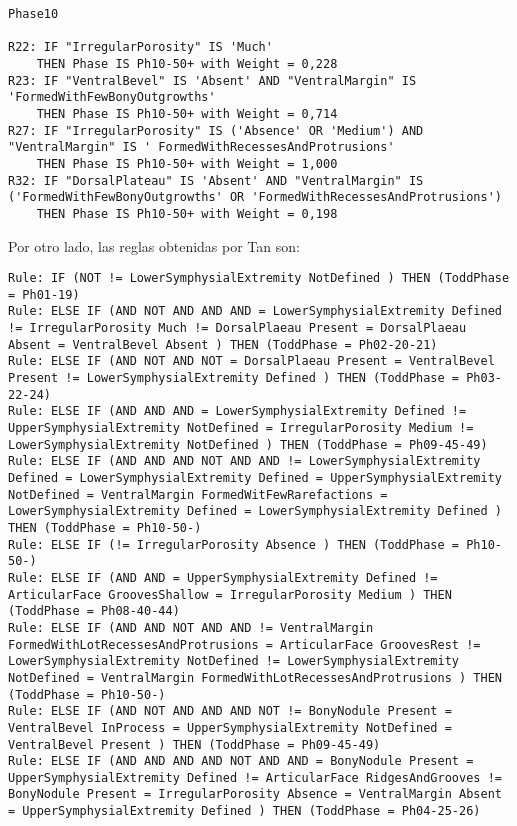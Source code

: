 \begin{lstlisting}
Phase10

R22: IF "IrregularPorosity" IS 'Much'
	THEN Phase IS Ph10-50+ with Weight = 0,228
R23: IF "VentralBevel" IS 'Absent' AND "VentralMargin" IS 'FormedWithFewBonyOutgrowths'
	THEN Phase IS Ph10-50+ with Weight = 0,714
R27: IF "IrregularPorosity" IS ('Absence' OR 'Medium') AND "VentralMargin" IS ' FormedWithRecessesAndProtrusions'
	THEN Phase IS Ph10-50+ with Weight = 1,000
R32: IF "DorsalPlateau" IS 'Absent' AND "VentralMargin" IS ('FormedWithFewBonyOutgrowths' OR 'FormedWithRecessesAndProtrusions')
	THEN Phase IS Ph10-50+ with Weight = 0,198
\end{lstlisting}

Por otro lado, las reglas obtenidas por Tan son:

\begin{lstlisting}
Rule: IF (NOT != LowerSymphysialExtremity NotDefined ) THEN (ToddPhase = Ph01-19)
Rule: ELSE IF (AND NOT AND AND AND = LowerSymphysialExtremity Defined != IrregularPorosity Much != DorsalPlaeau Present = DorsalPlaeau Absent = VentralBevel Absent ) THEN (ToddPhase = Ph02-20-21)
Rule: ELSE IF (AND NOT AND NOT = DorsalPlaeau Present = VentralBevel Present != LowerSymphysialExtremity Defined ) THEN (ToddPhase = Ph03-22-24)
Rule: ELSE IF (AND AND AND = LowerSymphysialExtremity Defined != UpperSymphysialExtremity NotDefined = IrregularPorosity Medium != LowerSymphysialExtremity NotDefined ) THEN (ToddPhase = Ph09-45-49)
Rule: ELSE IF (AND AND AND NOT AND AND != LowerSymphysialExtremity Defined = LowerSymphysialExtremity Defined = UpperSymphysialExtremity NotDefined = VentralMargin FormedWitFewRarefactions = LowerSymphysialExtremity Defined = LowerSymphysialExtremity Defined ) THEN (ToddPhase = Ph10-50-)
Rule: ELSE IF (!= IrregularPorosity Absence ) THEN (ToddPhase = Ph10-50-)
Rule: ELSE IF (AND AND = UpperSymphysialExtremity Defined != ArticularFace GroovesShallow = IrregularPorosity Medium ) THEN (ToddPhase = Ph08-40-44)
Rule: ELSE IF (AND AND NOT AND AND != VentralMargin FormedWithLotRecessesAndProtrusions = ArticularFace GroovesRest != LowerSymphysialExtremity NotDefined != LowerSymphysialExtremity NotDefined = VentralMargin FormedWithLotRecessesAndProtrusions ) THEN (ToddPhase = Ph10-50-)
Rule: ELSE IF (AND NOT AND AND AND NOT != BonyNodule Present = VentralBevel InProcess = UpperSymphysialExtremity NotDefined = VentralBevel Present ) THEN (ToddPhase = Ph09-45-49)
Rule: ELSE IF (AND AND AND AND NOT AND AND = BonyNodule Present = UpperSymphysialExtremity Defined != ArticularFace RidgesAndGrooves != BonyNodule Present = IrregularPorosity Absence = VentralMargin Absent = UpperSymphysialExtremity Defined ) THEN (ToddPhase = Ph04-25-26)

\end{lstlisting}
